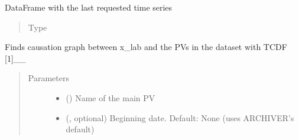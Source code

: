 \documentclass[letterpaper,10pt,english]{sphinxmanual}
\begin{document}
\begin{fulllineitems}
\begin{fulllineitems}
\begin{quote}
\begin{description}
\end{description}\end{quote}

\end{fulllineitems}


\begin{fulllineitems}
\label{\detokenize{dataset:dataset.Dataset.last_dataset}}
\sphinxAtStartPar
DataFrame with the last requested time series
\begin{quote}\begin{description}
\item[{Type}] \leavevmode
\sphinxAtStartPar
{}

\end{description}\end{quote}

\end{fulllineitems}


\begin{fulllineitems}
\label{\detokenize{dataset:dataset.Dataset.causation}}
\sphinxAtStartPar
Finds causation graph between x\_lab and the PVs in the dataset with TCDF {[}1{]}\_\_
\begin{quote}\begin{description}
\item[{Parameters}] \leavevmode\begin{itemize}
\item {} 
\sphinxAtStartPar
{} () \textendash{} Name of the main PV

\item {} 
\sphinxAtStartPar
{} (, optional) \textendash{} Beginning date. Default: None (uses ARCHIVER’s default)


\end{itemize}
\end{description}
\end{quote}
\end{fulllineitems}
\end{fulllineitems}
\end{document}
